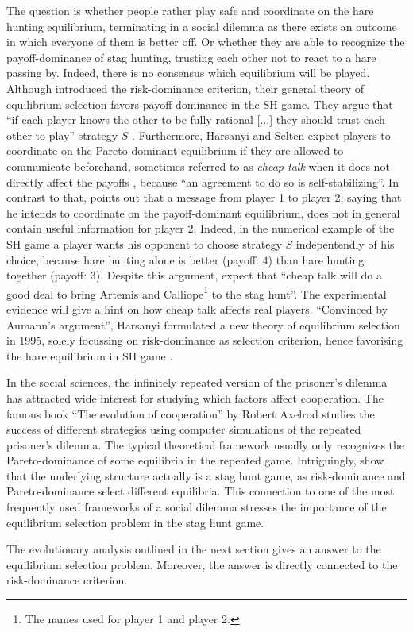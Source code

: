 The question is whether people rather play
safe and coordinate on the hare hunting equilibrium, terminating in a social
dilemma as there exists an outcome in which everyone of them is better off.
Or whether they are able to recognize the payoff-dominance of stag hunting, 
trusting each other not to react to a hare passing by.
Indeed, there is no consensus which equilibrium will be played. 
Although \textcite{harsanyi_general_1988} introduced the 
risk-dominance criterion, their general theory of equilibrium 
selection favors payoff-dominance in the SH game. They argue that
``if each player knows the other to be fully rational [...] they should trust
each other to play'' strategy $S$ \parencite[89]{harsanyi_general_1988}.
Furthermore, Harsanyi and Selten expect players to coordinate on the
Pareto-dominant equilibrium if they are allowed to communicate beforehand,
sometimes referred to as \textit{cheap talk} when it does not directly affect
the payoffs \parencite[104]{farrell_cheap_1996}, 
because ``an agreement to do so is self-stabilizing''. 
In contrast to that,
\textcite{aumann_nash_1990} points out that a message from player 1 to 
player 2, saying that he intends to coordinate on the payoff-dominant 
equilibrium, does not in general contain useful information for player 2. 
Indeed, in the numerical example of the SH game a player wants his
opponent to choose strategy $S$ indepentendly of his choice, because
hare hunting alone is better (payoff: $4$) than hare hunting together 
(payoff: $3$).
Despite this argument, 
\textcite[114]{farrell_cheap_1996} expect that 
``cheap talk will do a good deal to
bring Artemis and Calliope\footnote{The names
\textcite{farrell_cheap_1996} used for player 1 and player 2.} 
to the stag hunt''. The experimental evidence will give a hint on how cheap
talk affects real players. 
``Convinced by Aumann's argument'', Harsanyi formulated a new theory
of equilibrium selection in 1995, solely focussing on 
risk-dominance as selection criterion, hence favorising the hare 
equilibrium in SH game \parencite[92,94,96]{harsanyi_new_1995}. 

In the social sciences, the infinitely repeated version of the
prisoner's dilemma has attracted wide interest for studying which factors 
affect cooperation. The famous book ``The evolution of cooperation'' by Robert
Axelrod studies the success of different strategies using computer 
simulations of the repeated prisoner's dilemma. The typical theoretical
framework usually only recognizes the Pareto-dominance of some equilibria
in the repeated game. Intriguingly, \textcite{blonski_prisoners_2015} show
that the underlying structure actually is a stag hunt game, as risk-dominance
and Pareto-dominance select different equilibria. This connection to 
one of the most frequently used frameworks of a social dilemma stresses the
importance of the equilibrium selection problem in the stag hunt game.

The evolutionary analysis outlined in the next section gives an answer
to the equilibrium selection problem. Moreover, the answer is directly
connected to the risk-dominance criterion.
